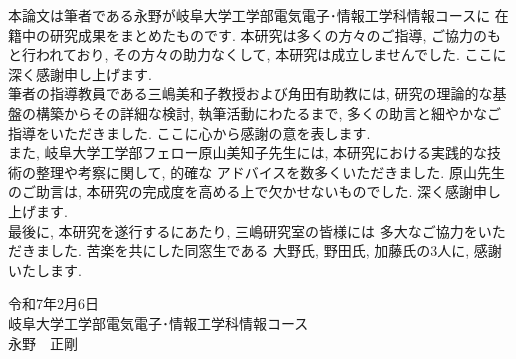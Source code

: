 本論文は筆者である永野が岐阜大学工学部電気電子･情報工学科情報コースに
在籍中の研究成果をまとめたものです. 本研究は多くの方々のご指導, 
ご協力のもと行われており, その方々の助力なくして, 
本研究は成立しませんでした. ここに深く感謝申し上げます. \\
\indent 筆者の指導教員である三嶋美和子教授および角田有助教には, 
研究の理論的な基盤の構築からその詳細な検討, 執筆活動にわたるまで, 
多くの助言と細やかなご指導をいただきました. 
ここに心から感謝の意を表します. \\
\indent また, 岐阜大学工学部フェロー原山美知子先生には, 
本研究における実践的な技術の整理や考察に関して, 的確な
アドバイスを数多くいただきました. 原山先生のご助言は, 
本研究の完成度を高める上で欠かせないものでした. 深く感謝申し上げます.\\ 
\indent 最後に, 本研究を遂行するにあたり, 三嶋研究室の皆様には
多大なご協力をいただきました. 苦楽を共にした同窓生である
大野氏, 野田氏, 加藤氏の3人に, 感謝いたします.\\[5em]

\begin{flushright}
  令和7年2月6日\\
  岐阜大学工学部電気電子･情報工学科情報コース\\
  永野　正剛
\end{flushright}
  